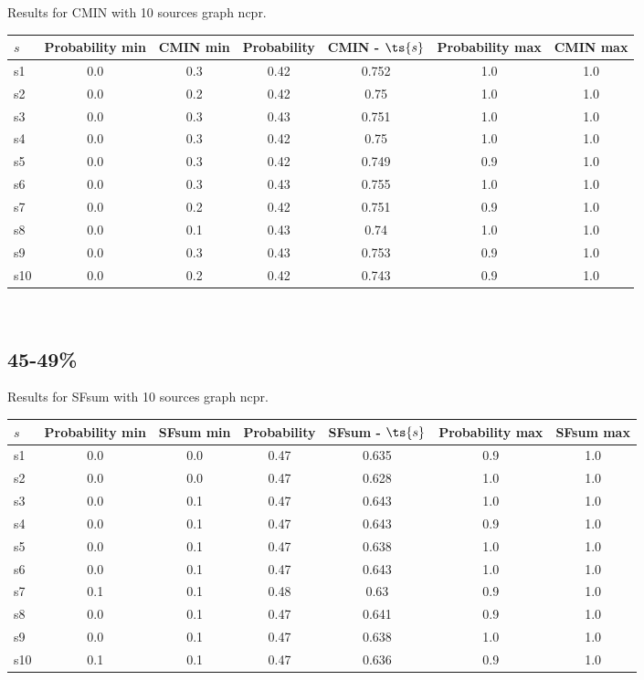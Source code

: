 \documentclass{article}
\begin{document}
\noindent Results for CMIN with 10 sources graph ncpr.

\noindent\begin{tabular}{|l|c|c|c|c|c|c|}
\hline
$s$& Probability min & CMIN min & Probability & CMIN - $\ts{s}$ & Probability max & CMIN max\\
\hline
s1 &0.0 & 0.3 & 0.42 & 0.752 & 1.0 & 1.0\\
\hline
s2 &0.0 & 0.2 & 0.42 & 0.75 & 1.0 & 1.0\\
\hline
s3 &0.0 & 0.3 & 0.43 & 0.751 & 1.0 & 1.0\\
\hline
s4 &0.0 & 0.3 & 0.42 & 0.75 & 1.0 & 1.0\\
\hline
s5 &0.0 & 0.3 & 0.42 & 0.749 & 0.9 & 1.0\\
\hline
s6 &0.0 & 0.3 & 0.43 & 0.755 & 1.0 & 1.0\\
\hline
s7 &0.0 & 0.2 & 0.42 & 0.751 & 0.9 & 1.0\\
\hline
s8 &0.0 & 0.1 & 0.43 & 0.74 & 1.0 & 1.0\\
\hline
s9 &0.0 & 0.3 & 0.43 & 0.753 & 0.9 & 1.0\\
\hline
s10 &0.0 & 0.2 & 0.42 & 0.743 & 0.9 & 1.0\\
\hline
\end{tabular}\\

\newpage

\subsection{45-49\%}

\noindent Results for SFsum with 10 sources graph ncpr.

\noindent\begin{tabular}{|l|c|c|c|c|c|c|}
\hline
$s$& Probability min & SFsum min & Probability & SFsum - $\ts{s}$ & Probability max & SFsum max\\
\hline
s1 &0.0 & 0.0 & 0.47 & 0.635 & 0.9 & 1.0\\
\hline
s2 &0.0 & 0.0 & 0.47 & 0.628 & 1.0 & 1.0\\
\hline
s3 &0.0 & 0.1 & 0.47 & 0.643 & 1.0 & 1.0\\
\hline
s4 &0.0 & 0.1 & 0.47 & 0.643 & 0.9 & 1.0\\
\hline
s5 &0.0 & 0.1 & 0.47 & 0.638 & 1.0 & 1.0\\
\hline
s6 &0.0 & 0.1 & 0.47 & 0.643 & 1.0 & 1.0\\
\hline
s7 &0.1 & 0.1 & 0.48 & 0.63 & 0.9 & 1.0\\
\hline
s8 &0.0 & 0.1 & 0.47 & 0.641 & 0.9 & 1.0\\
\hline
s9 &0.0 & 0.1 & 0.47 & 0.638 & 1.0 & 1.0\\
\hline
s10 &0.1 & 0.1 & 0.47 & 0.636 & 0.9 & 1.0\\
\hline
\end{tabular}\\
\end{document}
